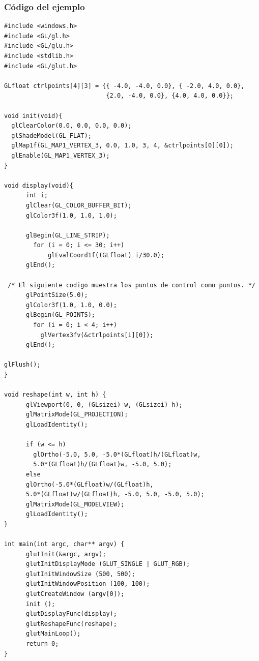 \subsubsection{Código del ejemplo}

\lstset{language=C, breaklines=true, basicstyle=\footnotesize}
\begin{lstlisting}
#include <windows.h>
#include <GL/gl.h>
#include <GL/glu.h>
#include <stdlib.h>
#include <GL/glut.h>

GLfloat ctrlpoints[4][3] = {{ -4.0, -4.0, 0.0}, { -2.0, 4.0, 0.0},
                            {2.0, -4.0, 0.0}, {4.0, 4.0, 0.0}};

void init(void){
  glClearColor(0.0, 0.0, 0.0, 0.0);
  glShadeModel(GL_FLAT);
  glMap1f(GL_MAP1_VERTEX_3, 0.0, 1.0, 3, 4, &ctrlpoints[0][0]);
  glEnable(GL_MAP1_VERTEX_3);
}

void display(void){
      int i;
      glClear(GL_COLOR_BUFFER_BIT);
      glColor3f(1.0, 1.0, 1.0);

      glBegin(GL_LINE_STRIP);
        for (i = 0; i <= 30; i++)
            glEvalCoord1f((GLfloat) i/30.0);
      glEnd();

 /* El siguiente codigo muestra los puntos de control como puntos. */
      glPointSize(5.0);
      glColor3f(1.0, 1.0, 0.0);
      glBegin(GL_POINTS);
        for (i = 0; i < 4; i++)
          glVertex3fv(&ctrlpoints[i][0]);
      glEnd();

glFlush();
}

void reshape(int w, int h) {
      glViewport(0, 0, (GLsizei) w, (GLsizei) h);
      glMatrixMode(GL_PROJECTION);
      glLoadIdentity();

      if (w <= h)
        glOrtho(-5.0, 5.0, -5.0*(GLfloat)h/(GLfloat)w,
        5.0*(GLfloat)h/(GLfloat)w, -5.0, 5.0);
      else
      glOrtho(-5.0*(GLfloat)w/(GLfloat)h,
      5.0*(GLfloat)w/(GLfloat)h, -5.0, 5.0, -5.0, 5.0);
      glMatrixMode(GL_MODELVIEW);
      glLoadIdentity();
}

int main(int argc, char** argv) {
      glutInit(&argc, argv);
      glutInitDisplayMode (GLUT_SINGLE | GLUT_RGB);
      glutInitWindowSize (500, 500);
      glutInitWindowPosition (100, 100);
      glutCreateWindow (argv[0]);
      init ();
      glutDisplayFunc(display);
      glutReshapeFunc(reshape);
      glutMainLoop();
      return 0;
}
\end{lstlisting}

